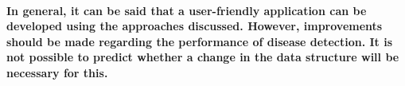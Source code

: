 \newline \\
\textbf{In general, it can be said that a user-friendly application can be developed using the approaches discussed. However, improvements should be made regarding the performance of disease detection. It is not possible to predict whether a change in the data structure will be necessary for this.}

